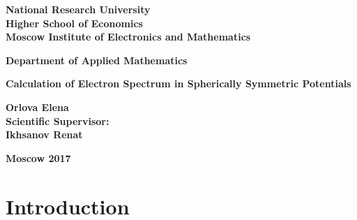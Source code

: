\documentclass[a4paper, 14pt]{article}
\begin{document}
	\begin{center}
		\large
		\textbf{National Research University}			
		\\
		\textbf{Higher School of Economics}									\\[3 cm]
		\textbf{Moscow Institute of Electronics and Mathematics}			\\[2 cm]
									
	\end{center}
	
	\begin{center}
		\large
		\textbf{Department of Applied Mathematics}		\\[3 cm]
	\end{center}
	
	
	
	\begin{center}
		\large
		\textbf{Calculation of Electron Spectrum in Spherically Symmetric Potentials}		\\[6 cm]
		
	\end{center}
	
	\begin{flushright}
		\large
		\textbf{Orlova Elena}				\\
		\textbf{Scientific Supervisor:}			\\
		\textbf{Ikhsanov Renat}		\\
	\end{flushright}
	
	\vfill
	\begin{center}
		\large
		\textbf{Moscow 2017}
	\end{center}
	\pagebreak
	
	
	
	

\tableofcontents
\pagebreak
	
\section{Introduction}
\end{document}
